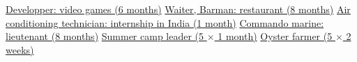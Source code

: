 \begin{joblist}[\tbfwidth][8.4][\tbfyeary]
{\begin{itemize}[leftmargin=*, label=\textbullet]
    \cvitem \href{https://tinmarino.github.io/page/}{Developper: video games (6 months)}
    \cvitem \href{http://www.insertcoin.cl/}{Waiter, Barman: restaurant (8 months)}
    \cvitem \href{http://www.dupont.co.in/}{Air conditioning technician: internship in India (1 month)}
    \cvitem \href{http://www.defense.gouv.fr/marine/organisation/forces/fusiliers-marins-et-commandos/force-maritime-des-fusiliers-marins-et-commandos}{Commando marine: lieutenant (8 months)}
    \cvitem \href{http://www.vacances-pour-tous.org/}{Summer camp leader (5 $\times$ 1 month)}
    \cvitem \href{http://huitresdesaintvaast.fr/}{Oyster farmer (5 $\times$ 2 weeks)}


    \end{itemize}
  }

\end{joblist}


\ifx\HCode\undefined
\else
    \maketitle
\fi





